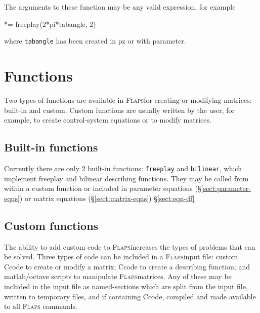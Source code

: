 \documentclass[10pt,openany,twoside]{book}
\numberwithin{equation}{section}   %
\newcommand{\Cmd}[1]{{\sf #1}}
\newcommand{\Code}[1]{{\small\tt #1}}
\newcommand{\Flaps}{{\normalfont\scshape Flaps\:}}
\newcommand{\Octlab}{\Cmd{matlab}/\Cmd{octave}\:}
\def\Cpp{{C\nolinebreak[4]\hspace{-.05em}\raisebox{.4ex}{\tiny\bf ++}}\:}
\newcommand{\Sectref}[1]{\S\ref{#1}}
\begin{document}
The arguments to these function may be any valid expression, for example
\begin{example}
[2,3] *= freeplay(2*pi*tabangle, 2)
\end{example}
where \Code{tabangle} has been created in \Cmd{pz} or with \Cmd{parameter}.

\newpage
\section{Functions}\label{sect:functions}
Two types of functions are available in \Flaps for creating or modifying
matrices: built-in and custom. Custom functions are usually written by the
user, for example, to create control-system equations or to modify matrices.

\subsection{Built-in functions} 
Currently there are only 2 built-in functions: \Code{freeplay} and \Code{bilinear},
which implement freeplay and bilinear describing functions. They may be called
from within a custom function or included in parameter equations
(\Sectref{sect:parameter-eqns}) or matrix equations (\Sectref{sect:matrix-eqns})
\Sectref{sect:eqn-df}

\subsection{Custom functions}\label{sect:custom-functions}
The ability to add custom code to \Flaps increases the types
of problems that can be solved. Three types of code can be included
in a \Flaps input file: custom \Cpp code to create or modify a matrix;
\Cpp code to create a describing function; and \Octlab
scripts to manipulate \Flaps matrices.
Any of these may be included in the input file as named-sections
which are split from the input file, written to temporary files, and
if containing \Cpp code, compiled and made available to all \Flaps
commands.
\end{document}
